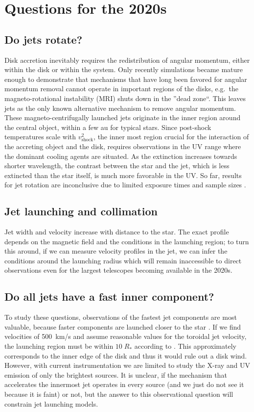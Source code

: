 \documentclass[12pt]{article}
\begin{document}
\section{Questions for the 2020s}

\subsection{Do jets rotate?}
Disk accretion inevitably requires the redistribution of angular momentum, either within the disk or within the system. Only recently simulations became mature enough to demonstrate that mechanisms that have long been favored for angular momentum removal cannot operate in important regions of the disks, e.g.\ the magneto-rotational instability (MRI) shuts down in the ''dead zone``. This  leaves jets as the only known alternative mechanism to remove angular momentum. These magneto-centrifugally launched jets originate in the inner region around the central object, within a few au for typical stars. Since post-shock temperatures scale with $v^2_\mathrm{shock}$, the inner most region crucial for the interaction of the accreting object and the disk, requires observations in the UV range where the dominant cooling agents are situated.
As the extinction increases towards shorter wavelength, the contrast between
the star and the jet, which is less extincted than the star itself, is much
more favorable in the UV. So far, results for jet rotation are inconclusive due
to limited exposure times and sample sizes \citep{2007ApJ...663..350C}. 

\subsection{Jet launching and collimation}
Jet width and velocity increase with distance to the star. The exact profile depends on the magnetic field and the conditions in the launching region; to turn this around, if we can measure velocity profiles in the jet, we can infer the conditions around the launching radius which will remain inaccessible to direct observations even for the largest telescopes becoming available in the 2020s.

\subsection{Do all jets have a fast inner component?}
To study these questions, observations of the fastest jet components are most
valuable, because faster components are launched closer to the star
\citep{2003ApJ...590L.107A}. If we find velocities of 500~km/s and assume
reasonable values for the toroidal jet velocity, the launching region must be
within $10\;R_*$ according to \citet{2003ApJ...590L.107A}. This approximately
corresponds to the inner edge of the disk and thus it would rule out a disk
wind. However, with current instrumentation we are limited to study the X-ray
and UV emission of only the brightest sources. It is unclear, if the mechanism
that accelerates the innermost jet operates in every source (and we just do not
see it because it is faint) or not, but the answer to this observational
question will constrain jet launching models.
\end{document}
